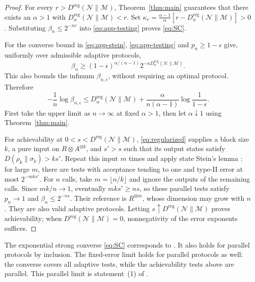 \documentclass[11pt,letterpaper]{article}
\numberwithin{equation}{section}
\newcommand{\N}{\mathcal N}
\newcommand{\M}{\mathcal M}
\newcommand{\reg}{\mathrm{reg}}
\newcommand{\Dt}{D}
\begin{document}
\begin{proof}
For every $r>D^{\reg}(\N\|\M)$, Theorem~\ref{thm:main} guarantees that there exists an $\alpha>1$ with $\Dt_\alpha^{\reg}(\N\|\M)<r$. Set
$\kappa_r=\frac{\alpha-1}{\alpha}[r-\Dt_\alpha^{\reg}(\N\|\M)]>0$.
Substituting $\beta_n\le2^{-nr}$ into \eqref{eq:app-testing} proves \eqref{eq:SC}.

For the converse bound in \eqref{eq:app-stein}, \eqref{eq:app-testing} and $p_n\ge1-\epsilon$ give, uniformly over admissible adaptive protocols,
\[
 \beta_n\ge(1-\epsilon)^{\alpha/(\alpha-1)}
                2^{-n\Dt_\alpha^{\reg}(\N\|\M)}.
\]
This also bounds the infimum $\beta_{n,\epsilon}$, without requiring an optimal protocol. Therefore
\[
 -\frac1n\log\beta_{n,\epsilon}
 \le\Dt_\alpha^{\reg}(\N\|\M)
 +\frac\alpha{n(\alpha-1)}\log\frac1{1-\epsilon}.
\]
First take the upper limit as $n\to\infty$ at fixed $\alpha>1$, then let $\alpha\downarrow1$ using Theorem~\ref{thm:main}.

For achievability at $0<s<D^{\reg}(\N\|\M)$, \eqref{eq:regularized} supplies a block size $k$, a pure input on $R\otimes A^{\otimes k}$, and $s'>s$ such that its output states satisfy $D(\rho_k\|\sigma_k)>ks'$. Repeat this input $m$ times and apply state Stein's lemma \cite{HP,ON}: for large $m$, there are tests with acceptance tending to one and type-II error at most $2^{-mks'}$. For $n$ calls, take $m=\lfloor n/k\rfloor$ and ignore the outputs of the remaining calls. Since $mk/n\to1$, eventually $mks'\ge ns$, so these parallel tests satisfy $p_n\to1$ and $\beta_n\le2^{-ns}$. Their reference is $R^{\otimes m}$, whose dimension may grow with $n$. They are also valid adaptive protocols. Letting $s\uparrow D^{\reg}(\N\|\M)$ proves achievability; when $D^{\reg}(\N\|\M)=0$, nonnegativity of the error exponents suffices.
\end{proof}

The exponential strong converse \eqref{eq:SC} corresponds to \cite[Corollary 22 and Theorem 23]{FGW}. It also holds for parallel protocols by inclusion. The fixed-error limit holds for parallel protocols as well: the converse covers all adaptive tests, while the achievability tests above are parallel. This parallel limit is statement~(1) of \cite[Theorem 14]{Gour}.
\end{document}
